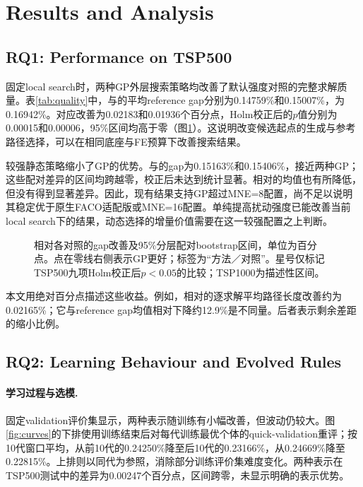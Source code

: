 \section{Results and Analysis}
\subsection{RQ1: Performance on TSP500}
固定local search时，两种GP外层搜索策略均改善了默认强度对照的完整求解质量。表\ref{tab:quality}中，\JS{}与\CT{}的平均reference gap分别为0.14759\%和0.15007\%，\Ueight{}为0.16942\%。对应改善为0.02183和0.01936个百分点，Holm校正后的$p$值分别为0.00015和0.00006，95\%区间均高于零（图\ref{fig:effects}）。这说明改变候选起点的生成与参考路径选择，可以在相同底座与FE预算下改善搜索结果。

\begin{table}[tb]
\caption{冻结测试的平均reference gap（\%，越低越好）。每个规模128个实例、10个ACO seed；GP结果再平均3个GP seed。}
\label{tab:quality}
\centering{}
\end{table}

较强静态策略缩小了GP的优势。\Rsixteen{}与\Usixteen{}的gap为0.15163\%和0.15406\%，接近两种GP；这些配对差异的区间均跨越零，校正后未达到统计显著。相对\FACO{}的均值也有所降低，但没有得到显著差异。因此，现有结果支持GP超过MNE=8配置，尚不足以说明其稳定优于原生FACO适配版或MNE=16配置。单纯提高扰动强度已能改善当前local search下的结果，动态选择的增量价值需要在这一较强配置之上判断。

\begin{figure}[tb]
\centering{}
\caption{相对各对照的gap改善及95\%分层配对bootstrap区间，单位为百分点。点在零线右侧表示GP更好；标签为“方法／对照”。星号仅标记TSP500九项Holm校正后$p<0.05$的比较；TSP1000为描述性区间。}
\label{fig:effects}
\end{figure}

本文用绝对百分点描述这些收益。例如，\JS{}相对\Ueight{}的逐求解平均路径长度改善约为0.02165\%；它与reference gap均值相对下降约12.9\%是不同量。后者表示剩余差距的缩小比例。

\subsection{RQ2: Learning Behaviour and Evolved Rules}
\paragraph{学习过程与选模.}
固定validation评价集显示，两种表示随训练有小幅改善，但波动仍较大。图\ref{fig:curves}的下排使用训练结束后对每代训练最优个体的quick-validation重评；按10代窗口平均，\JS{}从前10代的0.24250\%降至后10代的0.23166\%，\CT{}从0.24669\%降至0.22815\%。上排则以同代\Rsixteen{}为参照，消除部分训练评价集难度变化。两种表示在TSP500测试中的差异为0.00247个百分点，区间跨零，未显示明确的表示优势。

